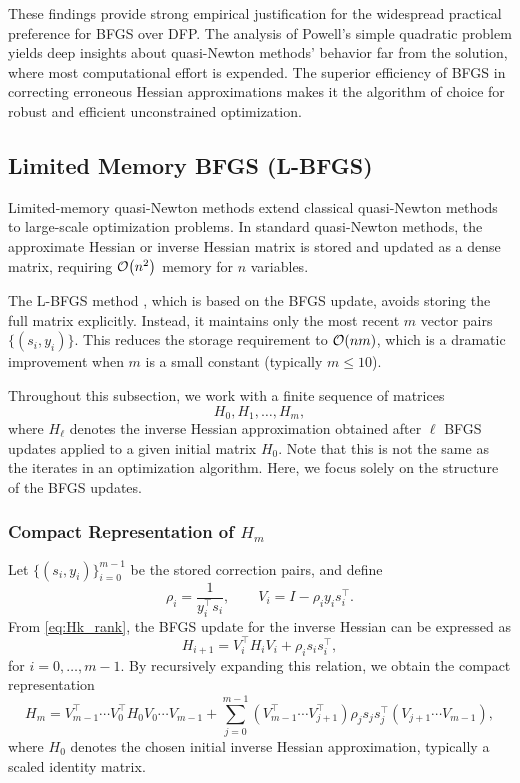 \documentclass[0_en]{subfiles}
\begin{document}
These findings provide strong empirical justification for the widespread practical preference for BFGS over DFP.
The analysis of Powell's simple quadratic problem yields deep insights about quasi-Newton methods' behavior far from the solution, where most computational effort is expended.
The superior efficiency of BFGS in correcting erroneous Hessian approximations makes it the algorithm of choice for robust and efficient unconstrained optimization.

\subsection{Limited Memory BFGS (L-BFGS)}

Limited-memory quasi-Newton methods extend classical quasi-Newton methods to large-scale optimization problems.
In standard quasi-Newton methods, the approximate Hessian or inverse Hessian matrix is stored and updated as a dense matrix, requiring $\order{n^2}$ memory for $n$ variables.

The L-BFGS method \citep{liuLimitedMemoryBFGS1989a}, which is based on the BFGS update, avoids storing the full matrix explicitly.
Instead, it maintains only the most recent $m$ vector pairs $\{(s_i,y_i)\}$.
This reduces the storage requirement to $\order{nm}$, which is a dramatic improvement when $m$ is a small constant (typically $m\le 10$).

Throughout this subsection, we work with a finite sequence of matrices
\begin{equation*}
    H_0, H_1, \dots, H_m,
\end{equation*}
where $H_\ell$ denotes the inverse Hessian approximation obtained after $\ell$ BFGS updates applied to a given initial matrix $H_0$.
Note that this is not the same as the iterates in an optimization algorithm. Here, we focus solely on the structure of the BFGS updates.

\subsubsection{Compact Representation of \texorpdfstring{$H_m$}{Hm}}

Let $\{(s_i,y_i)\}_{i=0}^{m-1}$ be the stored correction pairs, and define
\begin{equation}\label{eq:rho-V-def}
    \rho_i = \frac{1}{y_i^\top s_i}, \qquad
    V_i = I - \rho_i y_i s_i^\top.
\end{equation}
From \cref{eq:Hk_rank}, the BFGS update for the inverse Hessian can be expressed as
\begin{equation}\label{eq:Hk-bfgs-rank}
    H_{i+1} = V_i^\top H_i V_i + \rho_i s_i s_i^\top,
\end{equation}
for $i = 0,\dots,m-1$.
By recursively expanding this relation, we obtain the compact representation
\begin{equation}\label{eq:Hm-compact}
    H_m
    =
    V_{m-1}^\top \cdots V_0^\top H_0 V_0 \cdots V_{m-1}
    +
    \sum_{j=0}^{m-1}
    (V_{m-1}^\top \cdots V_{j+1}^\top)
    \rho_j s_j s_j^\top
    (V_{j+1} \cdots V_{m-1}),
\end{equation}
where $H_0$ denotes the chosen initial inverse Hessian approximation, typically a scaled identity matrix.
\end{document}
